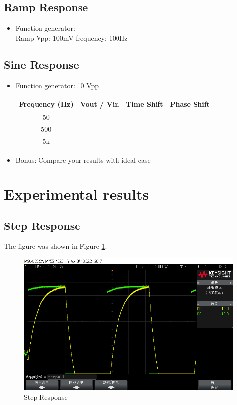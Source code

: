 \documentclass{article}
\begin{document}
\subsection{Ramp Response}
\begin{itemize}
	\item Function generator:\\
	Ramp \qquad Vpp: 100mV \qquad frequency: 100Hz
\end{itemize}

\subsection{Sine Response}
\begin{itemize}
	\item Function generator: 10 Vpp
	\begin{center}
		\begin{tabular}{|c|c|c|c|}
			\hline
			Frequency (Hz) & Vout / Vin & Time Shift & Phase Shift \\
			\hline
			50 &&&\\
			\hline
			500 &&&\\
			\hline
			5k &&&\\
			\hline
		\end{tabular}
	\end{center}
	\item Bonus: Compare your results with ideal case
\end{itemize}

\section{Experimental results}

\subsection{Step Response}
The figure was shown in Figure \ref{fig-1}.

\begin{figure}[htbp]
	\centering
	\includegraphics[width=0.7\linewidth]{1.bmp}
	\caption{Step Response}
	\label{fig-1}
\end{figure}
\end{document}
